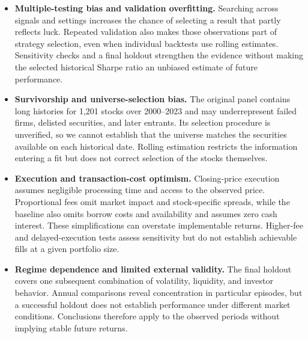 \begin{itemize}
    \item \textbf{Multiple-testing bias and validation overfitting.}
    Searching across signals and settings increases the chance of selecting
    a result that partly reflects luck. Repeated validation also makes
    those observations part of strategy selection, even when individual
    backtests use rolling estimates. Sensitivity checks and a final holdout
    strengthen the evidence without making the selected historical Sharpe
    ratio an unbiased estimate of future performance.

    \item \textbf{Survivorship and universe-selection bias.} The original
    panel contains long histories for 1,201 stocks over 2000--2023 and may
    underrepresent failed firms, delisted securities, and later entrants.
    Its selection procedure is unverified, so we cannot establish that
    the universe matches the securities available on each historical date.
    Rolling estimation restricts the information entering a fit but does
    not correct selection of the stocks themselves.

    \item \textbf{Execution and transaction-cost optimism.} Closing-price
    execution assumes negligible processing time and access to the observed
    price. Proportional fees omit market impact and stock-specific spreads,
    while the baseline also omits borrow costs and availability and assumes
    zero cash interest. These simplifications can overstate implementable
    returns. Higher-fee and delayed-execution tests assess sensitivity but
    do not establish achievable fills at a given portfolio size.

    \item \textbf{Regime dependence and limited external validity.} The
    final holdout covers one subsequent combination of volatility, liquidity,
    and investor behavior. Annual comparisons reveal concentration in
    particular episodes, but a successful holdout does not establish
    performance under different market conditions. Conclusions therefore
    apply to the observed periods without implying stable future returns.
\end{itemize}
